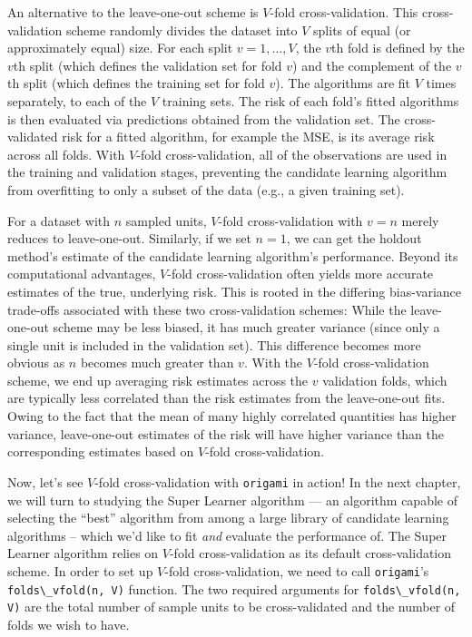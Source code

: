 \documentclass[
  12pt, krantz2,
]{krantz}
\newcommand{\passthrough}[1]{#1}
\newcommand{\1}{\mathbbm{1}}
\theoremstyle{definition}
\theoremstyle{definition}
\theoremstyle{definition}
\theoremstyle{definition}
\theoremstyle{remark}
\begin{document}
An alternative to the leave-one-out scheme is \(V\)-fold cross-validation. This
cross-validation scheme randomly divides the dataset into \(V\) splits of
equal (or approximately equal) size. For each split \(v=1,\ldots,V\), the
\(v\)th fold is defined by the \(v\)th split (which defines the validation set for
fold \(v\)) and the complement of the \(v\)th split (which defines the training set
for fold \(v\)). The algorithms are fit \(V\) times separately, to each of the
\(V\) training sets. The risk of each fold's fitted algorithms is then evaluated
via predictions obtained from the validation set. The cross-validated risk for
a fitted algorithm, for example the MSE, is its average risk across all folds.
With \(V\)-fold cross-validation, all of the observations
are used in the training and validation stages, preventing the candidate
learning algorithm from overfitting to only a subset of the data (e.g., a given
training set).

For a dataset with \(n\) sampled units, \(V\)-fold cross-validation with \(v=n\)
merely reduces to leave-one-out. Similarly, if we set \(n=1\), we can get the
holdout method's estimate of the candidate learning algorithm's performance.
Beyond its computational advantages, \(V\)-fold cross-validation often yields more
accurate estimates of the true, underlying risk. This is rooted in the differing
bias-variance trade-offs associated with these two cross-validation schemes:
While the leave-one-out scheme may be less biased, it has much greater variance
(since only a single unit is included in the validation set). This difference
becomes more obvious as \(n\) becomes much greater than \(v\). With the \(V\)-fold
cross-validation scheme, we end up averaging risk estimates across the \(v\)
validation folds, which are typically less correlated than the risk estimates
from the leave-one-out fits. Owing to the fact that the mean of many highly
correlated quantities has higher variance, leave-one-out estimates of the risk
will have higher variance than the corresponding estimates based on \(V\)-fold
cross-validation.

Now, let's see \(V\)-fold cross-validation with \passthrough{\lstinline!origami!} in action! In the next
chapter, we will turn to studying the Super Learner algorithm --- an algorithm
capable of selecting the ``best'' algorithm from among a large library of candidate
learning algorithms -- which we'd like to fit \emph{and} evaluate the performance of.
The Super Learner algorithm relies on \(V\)-fold cross-validation as its default
cross-validation scheme. In order to set up \(V\)-fold cross-validation, we need
to call \passthrough{\lstinline!origami!}'s \passthrough{\lstinline!folds\_vfold(n, V)!} function. The two required arguments for
\passthrough{\lstinline!folds\_vfold(n, V)!} are the total number of sample units to be cross-validated
and the number of folds we wish to have.
\end{document}
